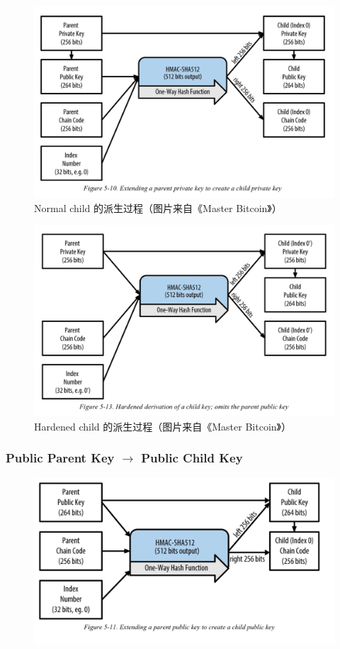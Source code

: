 \begin{figure}[h]
\centering
\includegraphics[width=.7\textwidth]{./CKDpriv.png}
\caption{Normal child 的派生过程（图片来自《Master Bitcoin》）}\label{fig-parsesig}
\end{figure}


\begin{figure}[h]
\centering
\includegraphics[width=.7\textwidth]{./CKDpriv2.png}
\caption{Hardened child 的派生过程（图片来自《Master Bitcoin》）}\label{fig-parsesig}
\end{figure}



\subsubsection{Public Parent Key $\rightarrow$ Public Child Key}

\begin{figure}[h]
\centering
\includegraphics[width=.7\textwidth]{./CKDpub.png}
\caption{}\label{fig-parsesig}
\end{figure}

